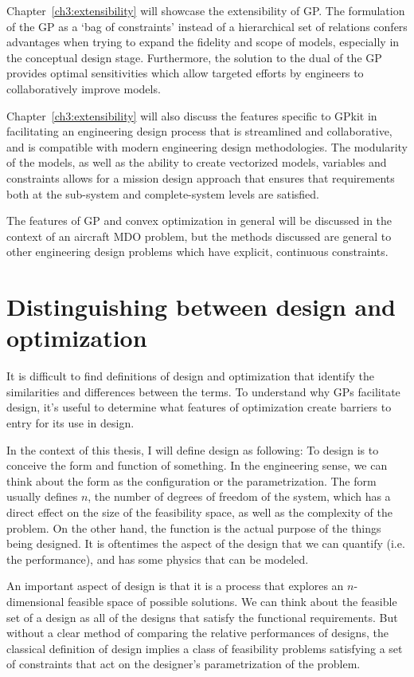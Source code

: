Chapter~\ref{ch3:extensibility} will showcase the extensibility of \gls{GP}.
The formulation of the \gls{GP} as a `bag of constraints' instead of a
hierarchical set of relations confers advantages
when trying to expand the fidelity and scope of models, especially in the
conceptual design stage. Furthermore, the solution to the dual of the \gls{GP}
provides optimal sensitivities which allow targeted efforts by engineers to
collaboratively improve models.

Chapter~\ref{ch3:extensibility} will also discuss the features specific to
GPkit in facilitating
an engineering design process that is streamlined and collaborative, and is
compatible with modern engineering design methodologies. The modularity of the
models, as well as the ability to create vectorized models, variables and constraints
allows for a mission design approach that ensures that
requirements both at the sub-system and complete-system levels are satisfied.

The features of \gls{GP} and convex optimization in general will be discussed in
the context of an aircraft \gls{MDO} problem, but the methods discussed
are general to other engineering design problems which have explicit, continuous constraints.

\section{Distinguishing between design and optimization} \label{s:DesVsOpt}

It is difficult to find definitions of design and optimization that
identify the similarities and differences between the terms.
To understand why \gls{GP}s facilitate design, it's useful to determine what
features of optimization create barriers to entry for its use in design.

In the context of this thesis, I will define design as following:
To design is to conceive the form and function of something.
In the engineering sense, we can think about the form as the configuration or
the parametrization. The form usually defines $n$, the number of degrees of freedom
of the system, which has a direct effect on the size of the feasibility
space, as well as the complexity of the problem.
On the other hand, the function is the actual purpose of the things
being designed. It is oftentimes the aspect of the design that we can
quantify (i.e. the performance), and has some physics that can be modeled.

An important aspect of design is that it is a process that explores an
$n$-dimensional feasible space of possible solutions.
We can think about the feasible set of a design as all of the designs
that satisfy the functional requirements. But without a clear method of comparing
the relative performances of designs, the classical
definition of design implies a class of feasibility problems satisfying a set of
constraints that act on the designer's parametrization of the problem.

